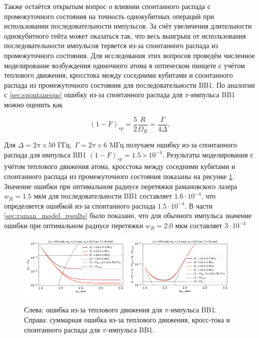 Также остаётся открытым вопрос о влиянии спонтанного распада с промежуточного состояния на точность однокубитных операций при использовании последовательности импульсов. За счёт увеличения длительности однокубитного гейта может оказаться так, что весь выигрыш от использования последовательности импульсов теряется из-за спонтанного распада из промежуточного состояния. Для исследования этих вопросов проведём численное моделирование возбуждения одиночного атома в оптическом пинцете с учётом теплового движения, кросстока между соседними кубитами и спонтанного распада из промежуточного состояния для последовательности BB1. По аналогии с \ref{sec:spontaneous} ошибку из-за спонтанного распада для $\pi$-импульса BB1 можно оценить как

\begin{equation}
	\left(1-F\right)_{sp}=\frac{5}{2}\frac{R}{\Omega_R}=\frac{\Gamma}{4\Delta},	
\end{equation}

Для $\Delta=2\pi\times 50 \text{ ГГц},\; \Gamma=2\pi \times 6 \text{ MГц}$ получаем ошибку из-за спонтанного распада для импульса BB1 $\left(1-F\right)_{sp} = 1.5\times{10}^{-4}$. Результаты моделирования с учётом теплового движения атома, кросстока между соседними кубитами и спонтанного распада из промежуточного состояния показаны на рисунке \ref{fig:errors_pipulse_total}. Значение ошибки при оптимальном радиусе перетяжки рамановского лазера $w_R =1.5 \text{ мкм}$ для последовательности BB1 составляет $1.6 \cdot 10^{-4}$, что определяется ошибкой из-за спонтанного распада $1.5 \cdot 10^{-4}$. В части \ref{sec:raman_model_results} было показано, что для обычного импульса значение ошибки при оптимальном радиусе перетяжки $w_R = 2.0 \text{ мкм}$ составляет $3 \cdot 10^{-3}$

\begin{figure}[H]
	\centering
	\includegraphics[width=0.48\textwidth]{images/BB1_Omega.pdf}
	\includegraphics[width=0.48\textwidth]{images/BB1_Omega_total.pdf}
	\caption{Слева: ошибка из-за теплового движения для $\pi$-импульса BB1. Справа: суммарная ошибка из-за теплового движения, кросс-тока и спонтанного распада для $\pi$-импульса BB1.}
	\label{fig:errors_pipulse_total}
\end{figure}

